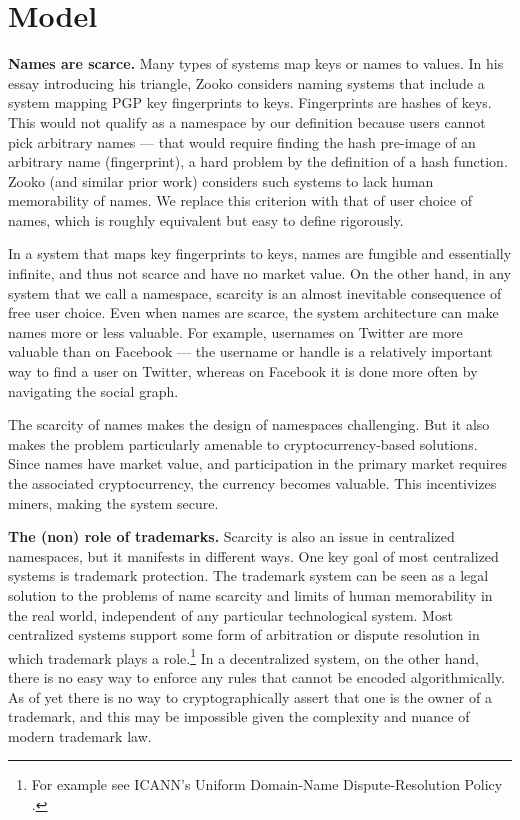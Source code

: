 \section{Model}
\label{sec:model}

{\bf Names are scarce.} Many types of systems map keys or names to values. In his essay introducing his triangle, Zooko considers naming systems that include a system mapping PGP key fingerprints to keys. Fingerprints are hashes of keys. This would not qualify as a namespace by our definition because users cannot pick arbitrary names --- that would require finding the hash pre-image of an arbitrary name (fingerprint), a hard problem by the definition of a hash function. Zooko (and similar prior work) considers such systems to lack human memorability of names. We replace this criterion with that of user choice of names, which is roughly equivalent but easy to define rigorously. 

In a system that maps key fingerprints to keys, names are fungible and essentially infinite, and thus not scarce and have no market value. On the other hand, in any system that we call a namespace, scarcity is an almost inevitable consequence of free user choice. Even when names are scarce, the system architecture can make names more or less valuable. For example, usernames on Twitter are more valuable than on Facebook --- the username or handle is a relatively important way to find a user on Twitter, whereas on Facebook it is done more often by navigating the social graph.

The scarcity of names makes the design of namespaces challenging. But it also makes the problem particularly amenable to cryptocurrency-based solutions. Since names have market value, and participation in the primary market requires the associated cryptocurrency, the currency becomes valuable. This incentivizes miners, making the system secure.

{\bf The (non) role of trademarks.} Scarcity is also an issue in centralized namespaces, but it manifests in different ways. One key goal of most centralized systems is trademark protection. The trademark system can be seen as a legal solution to the problems of name scarcity and limits of human memorability in the real world, independent of any particular technological system. Most centralized systems support some form of arbitration or dispute resolution in which trademark plays a role.\footnote{For example see ICANN's Uniform Domain-Name Dispute-Resolution Policy \cite{walker2000icann}.} In a decentralized system, on the other hand, there is no easy way to enforce any rules that cannot be encoded algorithmically. As of yet there is no way to cryptographically assert that one is the owner of a trademark, and this may be impossible given the complexity and nuance of modern trademark law.

